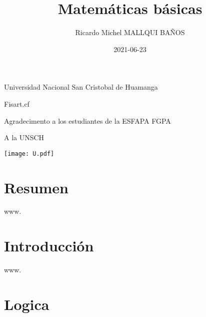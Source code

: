 \documentclass[
  16pt,
]{krantz}
\title{Matemáticas básicas}
\author{Ricardo Michel MALLQUI BAÑOS}
\date{2021-06-23}
\theoremstyle{definition}
\theoremstyle{definition}
\theoremstyle{definition}
\theoremstyle{definition}
\theoremstyle{remark}
\begin{document}
\maketitle

\thispagestyle{empty}
\begin{flushright}
Universidad Nacional San Cristobal de Huamanga

Fisart.cf

Agradecimento a los estudiantes de la ESFAPA FGPA

A la UNSCH

\texttt{[image: U.pdf]}
\end{flushright}

{
\hypersetup{linkcolor=}
\setcounter{tocdepth}{2}
\tableofcontents
}
\listoftables
\listoffigures
\newcommand{\N}{\mathbb{N}}
\newcommand{\R}{\mathbb{R}}
\newcommand{\CC}{\mathbb{C}}
\newcommand{\I}{\mathbb{I}}
\newcommand{\f}{\mathbb{f}}
\newcommand{\X}{\mathbb{X}}
\newcommand{\D}{\mathbb{D}}
\newcommand{\Z}{\mathbb{Z}}
\newcommand{\Q}{\mathbb{Q}}
\newcommand{\norm}[1]{\left\Vert#1\right\Vert}
\newcommand{\abs}[1]{\left\vert#1\right\vert}
\newcommand{\set}[1]{\left\{#1\right\}}
\newcommand{\seq}[1]{\left<#1\right>}
\newcommand{\co}[1]{\left[#1\right]}
\newcommand{\cc}[1]{\left(#1\right)}
\newcommand{\J}{\mathcal{J}}
\newcommand{\K}{\mathcal{K}}
\newcommand{\M}{\mathcal{M}}
\newcommand{\F}{\mathcal{F}}

\hypertarget{resumen}{%
\chapter*{Resumen}\label{resumen}}


www.

\hypertarget{introducciuxf3n}{%
\chapter*{Introducción}\label{introducciuxf3n}}


www.

\mainmatter

\hypertarget{logica}{%
\chapter{Logica}\label{logica}}
\end{document}
